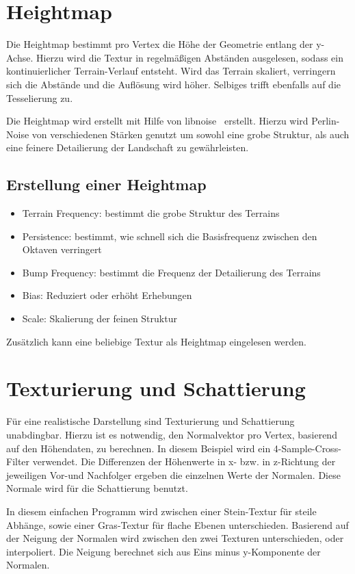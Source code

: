 \documentclass[a4paper,10pt]{article}
\begin{document}
\section*{Heightmap}
Die Heightmap bestimmt pro Vertex die Höhe der Geometrie entlang der y-Achse. Hierzu wird die Textur in regelmäßigen Abständen ausgelesen, sodass ein kontinuierlicher Terrain-Verlauf entsteht. Wird das Terrain skaliert, verringern sich die Abstände und die Auflösung wird höher. Selbiges trifft ebenfalls auf die Tesselierung zu.

Die Heightmap wird erstellt mit Hilfe von libnoise~\cite{libnoise} erstellt. Hierzu wird Perlin-Noise von verschiedenen Stärken genutzt um sowohl eine grobe Struktur, als auch eine feinere Detailierung der Landschaft zu gewährleisten. 

\subsection*{Erstellung einer Heightmap}
\begin{itemize}
\item Terrain Frequency: bestimmt die grobe Struktur des Terrains
\item Persistence: bestimmt, wie schnell sich die Basisfrequenz zwischen den Oktaven verringert
\item Bump Frequency: bestimmt die Frequenz der Detailierung des Terrains
\item Bias: Reduziert oder erhöht Erhebungen
\item Scale: Skalierung der feinen Struktur
\end{itemize}

Zusätzlich kann eine beliebige Textur als Heightmap eingelesen werden.

\section*{Texturierung und Schattierung}

Für eine realistische Darstellung sind Texturierung und Schattierung unabdingbar. Hierzu ist es notwendig, den Normalvektor pro Vertex, basierend auf den Höhendaten, zu berechnen. In diesem Beispiel wird ein 4-Sample-Cross-Filter verwendet. Die Differenzen der Höhenwerte in x- bzw. in z-Richtung der jeweiligen Vor-und Nachfolger ergeben die einzelnen Werte der Normalen. 
Diese Normale wird für die Schattierung benutzt. 

In diesem einfachen Programm wird zwischen einer Stein-Textur für steile Abhänge, sowie einer Gras-Textur für flache Ebenen unterschieden. Basierend auf der Neigung der Normalen wird zwischen den zwei Texturen unterschieden, oder interpoliert. Die Neigung berechnet sich aus Eins minus y-Komponente der Normalen. 
\end{document}
